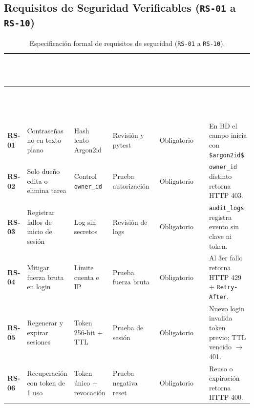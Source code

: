 \documentclass[12pt,a4paper]{article}
\begin{document}
\subsection{Requisitos de Seguridad Verificables (\texttt{RS-01} a \texttt{RS-10})}
\begin{longtable}{>{\bfseries\centering\arraybackslash}p{1.1cm} >{\raggedright\arraybackslash}p{2.9cm} >{\raggedright\arraybackslash}p{2.2cm} >{\raggedright\arraybackslash}p{2.2cm} >{\centering\arraybackslash}p{1.9cm} >{\raggedright\arraybackslash}p{3.4cm}}
\caption{Especificación formal de requisitos de seguridad (\texttt{RS-01} a \texttt{RS-10}).}
\label{tab:requisitos_rs} \\
\hline
\rowcolor{unsaacMaroon} \textcolor{white}{ID} & \textcolor{white}{Requisito de Seguridad} & \textcolor{white}{Control Esperado} & \textcolor{white}{Verificación} & \textcolor{white}{Clasificación} & \textcolor{white}{Criterio de Aceptación Medible} \\
\hline
\endfirsthead
\hline
\rowcolor{unsaacMaroon} \textcolor{white}{ID} & \textcolor{white}{Requisito de Seguridad} & \textcolor{white}{Control Esperado} & \textcolor{white}{Verificación} & \textcolor{white}{Clasificación} & \textcolor{white}{Criterio de Aceptación Medible} \\
\hline
\endhead
\multicolumn{6}{r}{\footnotesize\textit{Continúa en la página siguiente...}} \\
\endfoot
\hline
\endlastfoot
RS-01 & Contraseñas no en texto plano & Hash lento Argon2id & Revisión y pytest & Obligatorio & En BD el campo inicia con \texttt{\$argon2id\$}. \\
\rowcolor{rowAlt} RS-02 & Solo dueño edita o elimina tarea & Control \texttt{owner\_id} & Prueba autorización & Obligatorio & \texttt{owner\_id} distinto retorna HTTP 403. \\
RS-03 & Registrar fallos de inicio de sesión & Log sin secretos & Revisión de logs & Obligatorio & \texttt{audit\_logs} registra evento sin clave ni token. \\
\rowcolor{rowAlt} RS-04 & Mitigar fuerza bruta en login & Límite cuenta e IP & Prueba fuerza bruta & Obligatorio & Al 3er fallo retorna HTTP 429 + \texttt{Retry-After}. \\
RS-05 & Regenerar y expirar sesiones & Token 256-bit + TTL & Prueba de sesión & Obligatorio & Nuevo login invalida token previo; TTL vencido $\rightarrow$ 401. \\
\rowcolor{rowAlt} RS-06 & Recuperación con token de 1 uso & Token único + revocación & Prueba negativa reset & Obligatorio & Reuso o expiración retorna HTTP 400. \\

\end{longtable}
\end{document}
